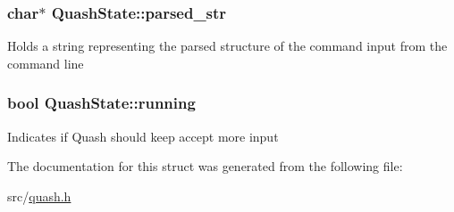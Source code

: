 \subsubsection[{\texorpdfstring{parsed\+\_\+str}{parsed_str}}]{\setlength{\rightskip}{0pt plus 5cm}char$\ast$ Quash\+State\+::parsed\+\_\+str}\hypertarget{structQuashState_a69d0ad3cb3bf44a92459020d98814f7e}{}\label{structQuashState_a69d0ad3cb3bf44a92459020d98814f7e}
Holds a string representing the parsed structure of the command input from the command line 
\subsubsection[{\texorpdfstring{running}{running}}]{\setlength{\rightskip}{0pt plus 5cm}bool Quash\+State\+::running}\hypertarget{structQuashState_a7db3a718696ee9d0c7f8b649ccb88bb4}{}\label{structQuashState_a7db3a718696ee9d0c7f8b649ccb88bb4}
Indicates if Quash should keep accept more input 

The documentation for this struct was generated from the following file\+:\begin{DoxyCompactItemize}
\item 
src/\hyperlink{quash_8h}{quash.\+h}\end{DoxyCompactItemize}
